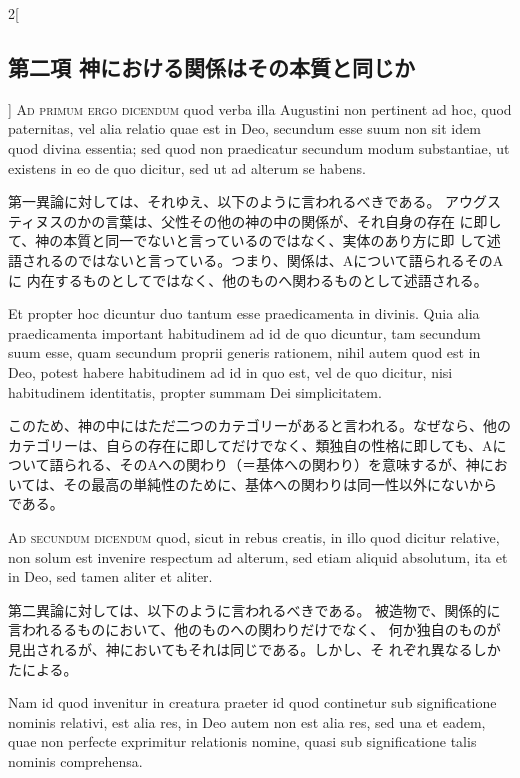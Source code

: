 \documentclass[paper=a4paper,fontsize=10pt,jafontsize=9pt,titlepage]{jlreq}
\begin{document}
\begin{paracol}{2}[\subsection{第二項 神における関係はその本質と同じか}]
{\scshape Ad primum ergo dicendum} quod verba illa Augustini non pertinent ad hoc,
quod paternitas, vel alia relatio quae est in Deo, secundum esse suum
non sit idem quod divina essentia; sed quod non praedicatur secundum
modum substantiae, ut existens in eo de quo dicitur, sed ut ad alterum
se habens.


\switchcolumn


第一異論に対しては、それゆえ、以下のように言われるべきである。
アウグスティヌスのかの言葉は、父性その他の神の中の関係が、それ自身の存在
 に即して、神の本質と同一でないと言っているのではなく、実体のあり方に即
 して述語されるのではないと言っている。つまり、関係は、Aについて語られるそのAに
 内在するものとしてではなく、他のものへ関わるものとして述語される。


\switchcolumn*


Et propter hoc dicuntur duo tantum esse praedicamenta in
divinis. Quia alia praedicamenta important habitudinem ad id de quo
dicuntur, tam secundum suum esse, quam secundum proprii generis
rationem, nihil autem quod est in Deo, potest habere habitudinem ad id
in quo est, vel de quo dicitur, nisi habitudinem identitatis, propter
summam Dei simplicitatem.


\switchcolumn


このため、神の中にはただ二つのカテゴリーがあると言われる。なぜなら、他の
 カテゴリーは、自らの存在に即してだけでなく、類独自の性格に即しても、Aに
 ついて語られる、そのAへの関わり（＝基体への関わり）を意味するが、神にお
 いては、その最高の単純性のために、基体への関わりは同一性以外にないから
 である。


\switchcolumn*[\subsection{ad.2}]


{\scshape Ad secundum dicendum} quod, sicut in rebus creatis, in illo quod dicitur
relative, non solum est invenire respectum ad alterum, sed etiam aliquid
absolutum, ita et in Deo, sed tamen aliter et aliter.


\switchcolumn


第二異論に対しては、以下のように言われるべきである。
被造物で、関係的に言われるるものにおいて、他のものへの関わりだけでなく、
 何か独自のものが見出されるが、神においてもそれは同じである。しかし、そ
 れぞれ異なるしかたによる。


\switchcolumn*


Nam id quod
invenitur in creatura praeter id quod continetur sub significatione
nominis relativi, est alia res, in Deo autem non est alia res, sed una
et eadem, quae non perfecte exprimitur relationis nomine, quasi sub
significatione talis nominis comprehensa.



\end{paracol}
\end{document}
